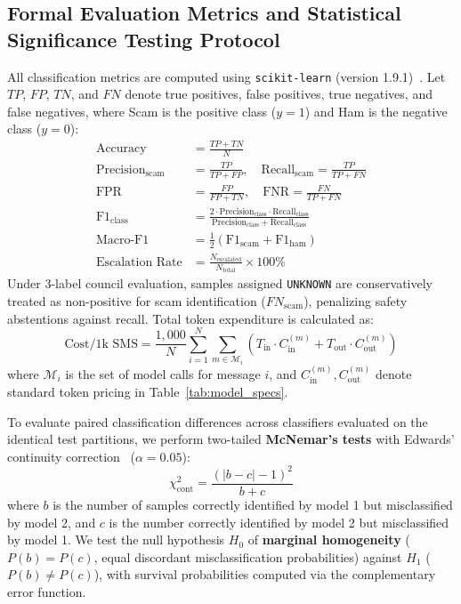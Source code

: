 \documentclass[journal]{IEEEtran}
\begin{document}
\subsection{Formal Evaluation Metrics and Statistical Significance Testing Protocol}
\label{subsec:mcnemar}

All classification metrics are computed using \texttt{scikit-learn} (version 1.9.1)~\cite{pedregosa2011scikit}. Let $TP$, $FP$, $TN$, and $FN$ denote true positives, false positives, true negatives, and false negatives, where Scam is the positive class ($y=1$) and Ham is the negative class ($y=0$):
\begin{align}
\text{Accuracy} &= \frac{TP + TN}{N} \\
\text{Precision}_{\text{scam}} &= \frac{TP}{TP + FP}, \quad \text{Recall}_{\text{scam}} = \frac{TP}{TP + FN} \\
\text{FPR} &= \frac{FP}{FP + TN}, \quad \text{FNR} = \frac{FN}{TP + FN} \\
\text{F1}_{\text{class}} &= \frac{2 \cdot \text{Precision}_{\text{class}} \cdot \text{Recall}_{\text{class}}}{\text{Precision}_{\text{class}} + \text{Recall}_{\text{class}}} \\
\text{Macro-F1} &= \frac{1}{2} \left( \text{F1}_{\text{scam}} + \text{F1}_{\text{ham}} \right) \\
\text{Escalation Rate} &= \frac{N_{\text{escalated}}}{N_{\text{total}}} \times 100\%
\end{align}
Under 3-label council evaluation, samples assigned \texttt{UNKNOWN} are conservatively treated as non-positive for scam identification ($FN_{\text{scam}}$), penalizing safety abstentions against recall. Total token expenditure is calculated as:
\begin{equation}
\text{Cost} / 1\text{k SMS} = \frac{1,000}{N} \sum_{i=1}^{N} \sum_{m \in \mathcal{M}_i} \left( T_{\text{in}} \cdot C_{\text{in}}^{(m)} + T_{\text{out}} \cdot C_{\text{out}}^{(m)} \right)
\end{equation}
where $\mathcal{M}_i$ is the set of model calls for message $i$, and $C_{\text{in}}^{(m)}, C_{\text{out}}^{(m)}$ denote standard token pricing in Table~\ref{tab:model_specs}.

To evaluate paired classification differences across classifiers evaluated on the identical test partitions, we perform two-tailed \textbf{McNemar's tests} with Edwards' continuity correction~\cite{mcnemar1947note, edwards1948note} ($\alpha = 0.05$):
\begin{equation}
\label{eq:mcnemar}
\chi^2_{\text{cont}} = \frac{(|b - c| - 1)^2}{b + c}
\end{equation}
where $b$ is the number of samples correctly identified by model 1 but misclassified by model 2, and $c$ is the number correctly identified by model 2 but misclassified by model 1. We test the null hypothesis $H_0$ of \textbf{marginal homogeneity} ($P(b) = P(c)$, equal discordant misclassification probabilities) against $H_1$ ($P(b) \neq P(c)$), with survival probabilities computed via the complementary error function.
\end{document}
